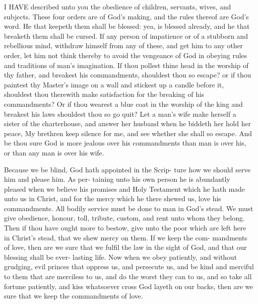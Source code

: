 \documentclass{custom}
\begin{document}
I HAVE described unto you the obedience of children, 
servants, wives, and subjects. These four orders are of 
God's making, and the rules thereof are God's word. 
He that keepeth them shall be blessed: yea, is blessed 
already, and he that breaketh them shall be cursed. If 
any person of impatience or of a stubborn and rebellious 
mind, withdraw himself from any of these, and get him to 
any other order, let him not think thereby to avoid the 
vengeance of God in obeying rules and traditions of man's 
imagination. If thou pollest thine head in the worship of 
thy father, and breakest his commandments, shouldest thou 
so escape? or if thou paintest thy Master's image on a wall 
and stickest up a candle before it, shouldest thou therewith 
make satisfaction for the breaking of his commandments? 
Or if thou wearest a blue coat in the worship of the king 
and breakest his laws shouldest thou so go quit? Let a man's 
wife make herself a sister of the charterhouse, and answer 
her husband when he biddeth her hold her peace, My 
brethren keep silence for me, and see whether she shall so 
escape. And be thou sure God is more jealous over his 
commandments than man is over his, or than any man is 
over his wife. 

Because we be blind, God hath appointed in the Scrip- 
ture how we should serve him and please him. As per- 
taining unto his own person he is abundantly pleased when 
we believe his promises and Holy Testament which he 
hath made unto us in Christ, and for the mercy which he 
there shewed us, love his commandments. All bodily 
service must be done to man in God's stead. We must 
give obedience, honour, toll, tribute, custom, and rent 
unto whom they belong. Then if thou have ought more 
to bestow, give unto the poor which are left here in Christ's 
stead, that we shew mercy on them. If we keep the com- 
mandments of love, then are we sure that we fulfil the law 
in the sight of God, and that our blessing shall be ever- 
lasting life. Now when we obey patiently, and without 
grudging, evil princes that oppress us, and persecute us, 
and be kind and merciful to them that are merciless to us, 
and do the worst they can to us, and so take all fortune 
patiently, and kiss whatsoever cross God layeth on our 
backs, then are we sure that we keep the commandments 
of love. 
\end{document}
